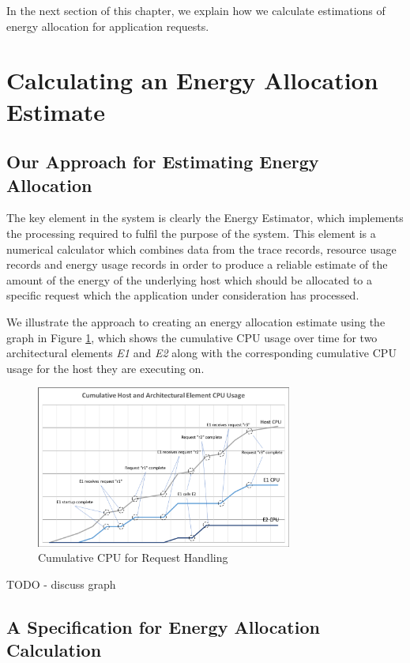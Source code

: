 In the next section of this chapter, we explain how we calculate estimations of energy allocation for application requests.

\section{Calculating an Energy Allocation Estimate}

\subsection{Our Approach for Estimating Energy Allocation}
The key element in the system is clearly the Energy Estimator, which implements the processing required to fulfil the purpose of the system.  This element is a numerical calculator which combines data from the trace records, resource usage records and energy usage records in order to produce a reliable estimate of the amount of the energy of the underlying host which should be allocated to a specific request which the application under consideration has processed.

We illustrate the approach to creating an energy allocation estimate using the graph in Figure \ref{figure:cpuusage}, which shows the cumulative CPU usage over time for two architectural elements \emph{E1} and \emph{E2} along with the corresponding cumulative CPU usage for the host they are executing on.

\begin{figure}
\centering
\includegraphics[width=0.75\textwidth]{Figures/estimating-energy-cpuusage}
\caption{Cumulative CPU for Request Handling}
\label{figure:cpuusage}
\end{figure}

TODO - discuss graph

\subsection{A Specification for Energy Allocation Calculation}


